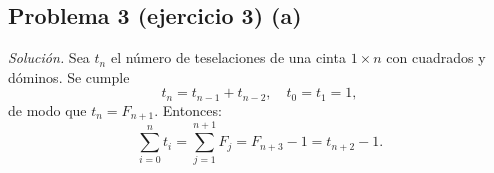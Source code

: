 \subsection*{Problema 3 (ejercicio 3) (a)}
\emph{Solución.}
Sea \(t_n\) el número de teselaciones de una cinta \(1\times n\) con cuadrados y dóminos. Se cumple
\[
t_n = t_{n-1}+t_{n-2},\quad t_0=t_1=1,
\]
de modo que \(t_n=F_{n+1}\). Entonces:
\[
\sum_{i=0}^n t_i
= \sum_{j=1}^{n+1}F_j
= F_{n+3}-1
= t_{n+2}-1.
\]
